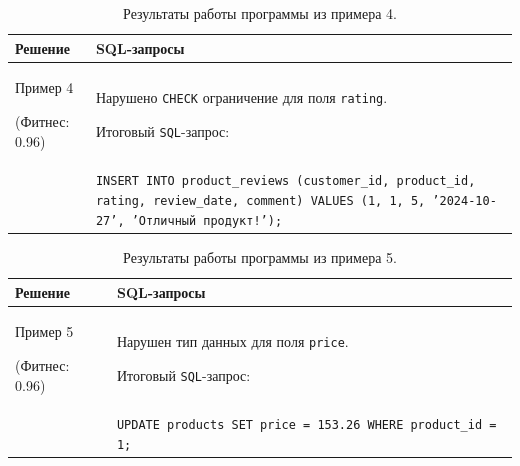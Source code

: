 \documentclass[master,paper]{pmk-graduate}
\begin{document}
\begin{table}
	\centering
	\begin{tabularx}{\linewidth}{@{}>{\hsize=0.5\hsize}X>{\hsize=1.5\hsize}X@{}}
		\toprule
		\textbf{Решение} & \textbf{SQL-запросы} \\
		\midrule
		Пример 4 
		
		(Фитнес: 0.96) & 
		Нарушено \texttt{CHECK} ограничение для поля \texttt{rating}.
		
		Итоговый \texttt{SQL}-запрос: \\
		& \texttt{INSERT INTO product\_reviews (customer\_id, product\_id, rating, review\_date, comment) VALUES (1, 1, 5, '2024-10-27', 'Отличный продукт!');} \\
		\bottomrule
	\end{tabularx}
	\caption{Результаты работы программы из примера 4.}
	\label{table4}
\end{table}

\begin{table}
	\centering
	\begin{tabularx}{\linewidth}{@{}>{\hsize=0.5\hsize}X>{\hsize=1.5\hsize}X@{}}
		\toprule
		\textbf{Решение} & \textbf{SQL-запросы} \\
		\midrule
		Пример 5 
		
		(Фитнес: 0.96) & 
		Нарушен тип данных для поля \texttt{price}.
		
		Итоговый \texttt{SQL}-запрос: \\
		& \texttt{UPDATE products SET price = 153.26 WHERE product\_id = 1;} \\
		\bottomrule
	\end{tabularx}
	\caption{Результаты работы программы из примера 5.}
	\label{table5}
\end{table}
\end{document}
